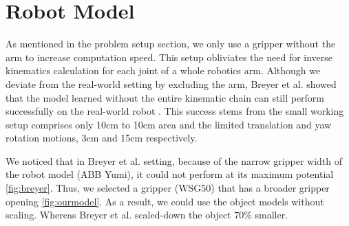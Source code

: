\section{Robot Model}
As mentioned in the problem setup section, we only use a gripper without the arm to increase computation speed. This setup obliviates the need for inverse kinematics calculation for each joint of a whole robotics arm. Although we deviate from the real-world setting by excluding the arm, Breyer et al. showed that the model learned without the entire kinematic chain can still perform successfully on the real-world robot \cite{Breyer2018}. This success stems from the small working setup comprises only 10cm to 10cm area and the limited translation and yaw rotation motions, 3cm and 15cm respectively.

We noticed that in Breyer et al. setting, because of the narrow gripper width of the robot model (ABB Yumi), it could not perform at its maximum potential \ref{fig:breyer}. Thus, we selected a gripper (WSG50) that has a broader gripper opening \ref{fig:ourmodel}. As a result, we could use the object models without scaling. Whereas Breyer et al. scaled-down the object \(70\%\) smaller.


